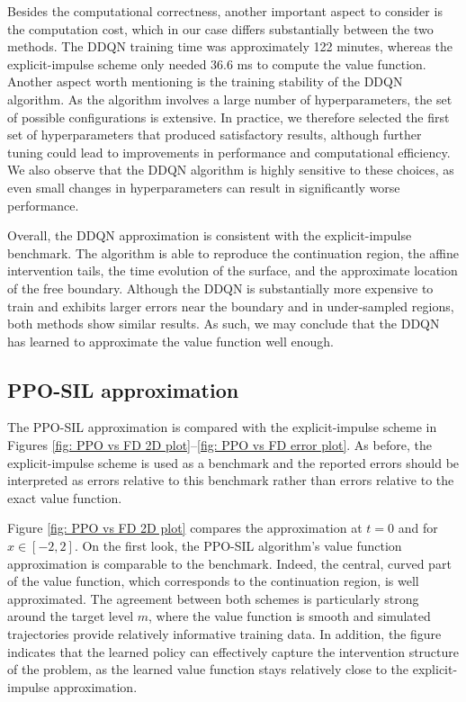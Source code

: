 Besides the computational correctness, another important aspect to consider is the computation cost, which in our case differs substantially between the two methods. The DDQN training time was approximately 122 minutes, whereas the explicit-impulse scheme only needed 36.6 ms to compute the value function. Another aspect worth mentioning is the training stability of the DDQN algorithm. As the algorithm involves a large number of hyperparameters, the set of possible configurations is extensive. In practice, we therefore selected the first set of hyperparameters that produced satisfactory results, although further tuning could lead to improvements in performance and computational efficiency. We also observe that the DDQN algorithm is highly sensitive to these choices, as even small changes in hyperparameters can result in significantly worse performance.

Overall, the DDQN approximation is consistent with the explicit-impulse benchmark. The algorithm is able to reproduce the continuation region, the affine intervention tails, the time evolution of the surface, and the approximate location of the free boundary. Although the DDQN  is substantially more expensive to train and exhibits larger errors near the boundary and in under-sampled regions, both methods show similar results. As such, we may conclude that the DDQN has learned to approximate the value function well enough.

\subsection{PPO-SIL approximation}
The PPO-SIL approximation is compared with the explicit-impulse scheme in Figures \ref{fig: PPO vs FD 2D plot}--\ref{fig: PPO vs FD error plot}. As before, the explicit-impulse scheme is used as a benchmark and the reported errors should be interpreted as errors relative to this benchmark rather than errors relative to the exact value function.

Figure \ref{fig: PPO vs FD 2D plot} compares the approximation at $t=0$ and for $x \in [-2,2]$. On the first look, the PPO-SIL algorithm's value function approximation is comparable to the benchmark. Indeed, the central, curved part of the value function, which corresponds to the continuation region, is well approximated. The agreement between both schemes is particularly strong around the target level \(m\), where the value function is smooth and simulated trajectories provide relatively informative training data. In addition, the figure indicates that the learned policy can effectively capture the intervention structure of the problem, as the learned value function stays relatively close to the explicit-impulse approximation.

